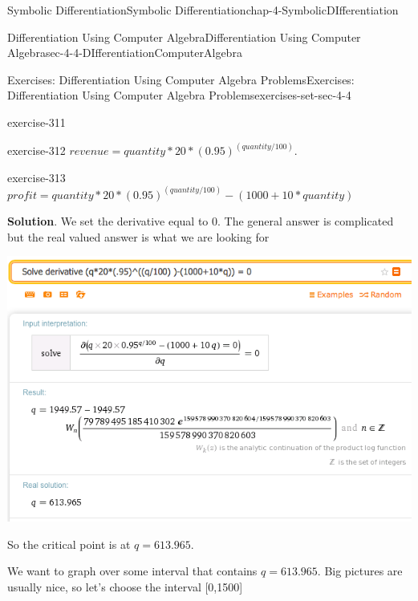 \documentclass[oneside,10pt,]{book}
\numberwithin{equation}{section}
\begin{document}
\begin{chapterptx}{Symbolic Differentiation}{}{Symbolic Differentiation}{}{}{chap-4-SymbolicDIfferentiation}
\begin{sectionptx}{Differentiation Using Computer Algebra}{}{Differentiation Using Computer Algebra}{}{}{sec-4-4-DIfferentiationComputerAlgebra}
\begin{exercises-subsection-numberless}{Exercises: Differentiation Using Computer Algebra Problems}{}{Exercises: Differentiation Using Computer Algebra Problems}{}{}{exercises-set-sec-4-4}
\begin{divisionexercise}{23}{}{}{exercise-311}
\begin{sidebyside}{1}{0.2}{0.2}{0}
\end{sidebyside}%
\end{divisionexercise}%
\begin{divisionexercise}{24}{}{}{exercise-312}%
\hypertarget{p-1780}{}%
\(revenue=quantity*20*(0.95)^{(quantity/100)}\).%
\end{divisionexercise}%
\begin{divisionexercise}{25}{}{}{exercise-313}%
\hypertarget{p-1781}{}%
\(profit=quantity*20*(0.95)^{(quantity/100) }-(1000+10*quantity)\)%
\par\smallskip%
\noindent\textbf{Solution}.\hypertarget{solution-156}{}\quad%
\hypertarget{p-1782}{}%
We set the derivative equal to 0. The general answer is complicated but the real valued answer is what we are looking for%
\begin{sidebyside}{1}{0.15}{0.15}{0}%
\begin{sbspanel}{0.7}%
\includegraphics[width=1\linewidth]{images/sec4-4-sol25a.png}
\end{sbspanel}%
\end{sidebyside}%
\par
\hypertarget{p-1783}{}%
So the critical point is at \(q = 613.965\).%
\par
\hypertarget{p-1784}{}%
We want to graph over some interval that contains \(q = 613.965\). Big pictures are usually nice, so let’s choose the interval [0,1500]%
\begin{sidebyside}{1}{0.2}{0.2}{0}%
\begin{sbspanel}{0.6}%

\end{sbspanel}
\end{sidebyside}
\end{divisionexercise}
\end{exercises-subsection-numberless}
\end{sectionptx}
\end{chapterptx}
\end{document}

